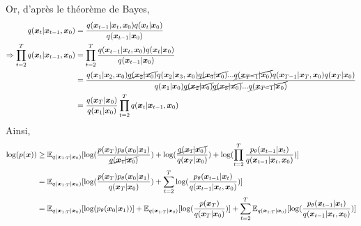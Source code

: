 \documentclass{article}
\begin{document}
Or, d'après le théorème de Bayes, 
\begin{align*}
q(\boldsymbol{x}_t|\boldsymbol{x}_{t-1},\boldsymbol{x}_{0}) &= \frac{q(\boldsymbol{x}_{t-1}|\boldsymbol{x}_t,\boldsymbol{x}_{0})q(\boldsymbol{x}_t|\boldsymbol{x}_{0})}{q(\boldsymbol{x}_{t-1}|\boldsymbol{x}_{0})} \\
\Rightarrow \prod_{t=2}^{T} q(\boldsymbol{x}_t|\boldsymbol{x}_{t-1},\boldsymbol{x}_{0}) &= \prod_{t=2}^{T} \frac{q(\boldsymbol{x}_{t-1}|\boldsymbol{x}_t,\boldsymbol{x}_{0})q(\boldsymbol{x}_t|\boldsymbol{x}_{0})}{q(\boldsymbol{x}_{t-1}|\boldsymbol{x}_{0})} \\
&= \frac{q(\boldsymbol{x}_{1}|\boldsymbol{x}_2,\boldsymbol{x}_{0})\cancel{q(\boldsymbol{x}_2|\boldsymbol{x}_{0})} q(\boldsymbol{x}_{2}|\boldsymbol{x}_3,\boldsymbol{x}_{0})\cancel{q(\boldsymbol{x}_3|\boldsymbol{x}_{0})} ... \cancel{q(\boldsymbol{x}_{T-1}|\boldsymbol{x}_{0})}q(\boldsymbol{x}_{T-1}|\boldsymbol{x}_T,\boldsymbol{x}_{0})q(\boldsymbol{x}_T|\boldsymbol{x}_{0})}{q(\boldsymbol{x}_1|\boldsymbol{x}_{0})\cancel{q(\boldsymbol{x}_2|\boldsymbol{x}_{0})}\cancel{q(\boldsymbol{x}_3|\boldsymbol{x}_{0})}...\cancel{q(\boldsymbol{x}_{T-1}|\boldsymbol{x}_{0})}} \\
&= \frac{q(\boldsymbol{x}_T|\boldsymbol{x}_{0})}{q(\boldsymbol{x}_1|\boldsymbol{x}_{0})} \prod_{t=2}^{T} q(\boldsymbol{x}_t|\boldsymbol{x}_{t-1},\boldsymbol{x}_{0})
\end{align*}
Ainsi, 
\begin{align*}
\log(p(\boldsymbol{x})) &\geq \mathbb{E}_{q(\boldsymbol{x}_{1:T}|\boldsymbol{x}_0)}[\log(\frac{p(\boldsymbol{x}_T)p_{\theta}(\boldsymbol{x}_0|\boldsymbol{x}_1)}{\cancel{q(\boldsymbol{x}_1|\boldsymbol{x}_0)}}) + \log(\frac{\cancel{q(\boldsymbol{x}_1|\boldsymbol{x}_{0})}}{q(\boldsymbol{x}_T|\boldsymbol{x}_{0})}) + \log(\prod_{t=2}^T \frac{p_{\theta}(\boldsymbol{x}_{t-1}|\boldsymbol{x}_t)}{q(\boldsymbol{x}_{t-1}|\boldsymbol{x}_t,\boldsymbol{x}_{0})})] \\
&= \mathbb{E}_{q(\boldsymbol{x}_{1:T}|\boldsymbol{x}_0)}[\log(\frac{p(\boldsymbol{x}_T)p_{\theta}(\boldsymbol{x}_0|\boldsymbol{x}_1)}{q(\boldsymbol{x}_T|\boldsymbol{x}_{0})}) + \sum_{t=2}^T \log(\frac{p_{\theta}(\boldsymbol{x}_{t-1}|\boldsymbol{x}_t)}{q(\boldsymbol{x}_{t-1}|\boldsymbol{x}_t,\boldsymbol{x}_{0})})] \\
&= \mathbb{E}_{q(\boldsymbol{x}_{1:T}|\boldsymbol{x}_0)}[\log(p_{\theta}(\boldsymbol{x}_0|\boldsymbol{x}_1))] + \mathbb{E}_{q(\boldsymbol{x}_{1:T}|\boldsymbol{x}_0)}[\log(\frac{p(\boldsymbol{x}_T)}{q(\boldsymbol{x}_T|\boldsymbol{x}_{0})})] + \sum_{t=2}^T \mathbb{E}_{q(\boldsymbol{x}_{1:T}|\boldsymbol{x}_0)}[\log(\frac{p_{\theta}(\boldsymbol{x}_{t-1}|\boldsymbol{x}_t)}{q(\boldsymbol{x}_{t-1}|\boldsymbol{x}_t,\boldsymbol{x}_{0})})]
\end{align*}
\end{document}
